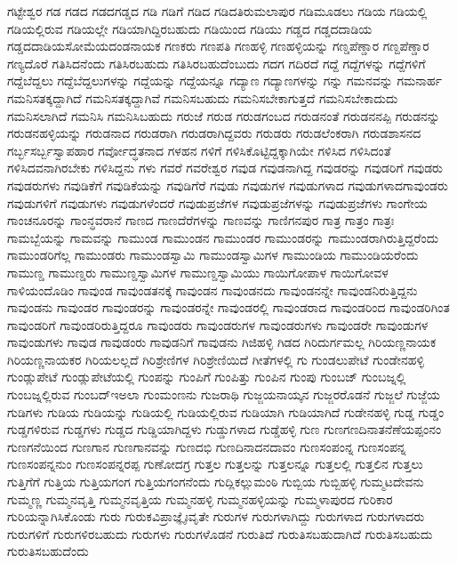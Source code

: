 {ಗಟ್ಟೇಶ್ವರ
ಗಡ
ಗಡದ
ಗಡದಗಡ್ಡದ
ಗಡಿ
ಗಡಿಗೆ
ಗಡಿದ
ಗಡಿದತಿರುಮಲಾಪುರ
ಗಡಿಮೂಡಲು
ಗಡಿಯ
ಗಡಿಯಲ್ಲಿ
ಗಡಿಯಲ್ಲಿರುವ
ಗಡಿಯಲ್ಲೇ
ಗಡಿಯಾಗಿದ್ದಿರಬಹುದು
ಗಡಿಯಿಂದ
ಗಡಿಯು
ಗಡ್ಡದ
ಗಡ್ಡದದಾಡಿಯ
ಗಡ್ಡದದಾಡಿಯಸೋಮೆಯದಂಡನಾಯಕ
ಗಣಕರು
ಗಣಪತಿ
ಗಣಹಳ್ಳಿ
ಗಣಹಳ್ಳಿಯನ್ನು
ಗಣ್ಡಪೆಣ್ಡಾರ
ಗಣ್ದಪೆಣ್ಡಾರ
ಗಣ್ಯದೊರೆ
ಗತಿಸಿದನೆಂದು
ಗತಿಸಿರಬಹುದು
ಗತಿಸಿರಬಹುದೆಂಬುದು
ಗದಗ
ಗದಿರದೆ
ಗದ್ದೆ
ಗದ್ದೆಗಳನ್ನು
ಗದ್ದೆಗಳಿಗೆ
ಗದ್ದೆಬೆದ್ದಲು
ಗದ್ದೆಬೆದ್ದಲುಗಳನ್ನು
ಗದ್ದೆಯನ್ನು
ಗದ್ದೆಯನ್ನೂ
ಗದ್ಯಾಣ
ಗದ್ಯಾಣಗಳನ್ನು
ಗನ್ನು
ಗಮನವನ್ನು
ಗಮನಾರ್ಹ
ಗಮನಿಸತಕ್ಕದ್ದಾಗಿದೆ
ಗಮನಿಸತಕ್ಕದ್ದಾಗಿವೆ
ಗಮನಿಸಬಹುದು
ಗಮನಿಸಬೇಕಾಗುತ್ತದೆ
ಗಮನಿಸಬೇಕಾದುದು
ಗಮನಿಸಲಾಗಿದೆ
ಗಮನಿಸಿ
ಗಮನಿಸಿಬಹುದು
ಗರುಜೆ
ಗರುಡ
ಗರುಡಗಂಬದ
ಗರುಡನಂತೆ
ಗರುಡನನಪ್ಪಿ
ಗರುಡನನ್ನು
ಗರುಡನಹಳ್ಳಿಯನ್ನು
ಗರುಡನಾದ
ಗರುಡರಾಗಿ
ಗರುಡರಾಗಿದ್ದವರು
ಗರುಡರು
ಗರುಡಲೆಂಕರಾಗಿ
ಗರುಡಶಾಸನದ
ಗರ್ಬ್ಭಸರ್ಬ್ಬಸ್ವಾಪಹಾರ
ಗರ್ವೋದ್ಧತನಾದ
ಗಳಹನ
ಗಳಿಗೆ
ಗಳಿಸಿಕೊಟ್ಟಿದ್ದಕ್ಕಾಗಿಯೇ
ಗಳಿಸಿದ
ಗಳಿಸಿದಂತೆ
ಗಳಿಸಿದವನಾಗಿರಬೇಕು
ಗಳಿಸಿದ್ದನು
ಗಳು
ಗವರೆ
ಗವರೇಶ್ವರ
ಗವುಡ
ಗವುಡನಾಗಿದ್ದ
ಗವುಡರನ್ನು
ಗವುಡರಿಗೆ
ಗವುಡರು
ಗವುಡರುಗಳು
ಗವುಡಿಕೆಗೆ
ಗವುಡಿಕೆಯನ್ನು
ಗವುಡಿಗೆರೆ
ಗವುಡು
ಗವುಡುಗಳ
ಗವುಡುಗಳಾದ
ಗವುಡುಗಳಾದಗಾವುಂಡರು
ಗವುಡುಗಳಿಗೆ
ಗವುಡುಗಳು
ಗವುಡುಗಳೆಂದರೆ
ಗವುಡುಪ್ರಜೆಗಳ
ಗವುಡುಪ್ರಜೆಗಳನ್ನು
ಗವುಡುಪ್ರಜೆಗಳು
ಗಾಂಗೇಯ
ಗಾಂಚನೂರನ್ನು
ಗಾಂನ್ಧವರಾನೆ
ಗಾಣದ
ಗಾಣದೆರೆಗಳನ್ನು
ಗಾಣವನ್ನು
ಗಾಣಿಗನಪುರ
ಗಾತ್ರ
ಗಾತ್ರಂ
ಗಾತ್ರಃ
ಗಾಮಬ್ಬೆಯನ್ನು
ಗಾಮವನ್ನು
ಗಾಮುಂಡ
ಗಾಮುಂಡನ
ಗಾಮುಂಡರ
ಗಾಮುಂಡರನ್ನು
ಗಾಮುಂಡರಾಗಿರುತ್ತಿದ್ದರೆಂದು
ಗಾಮುಂಡರಿಗೆಲ್ಲ
ಗಾಮುಂಡರು
ಗಾಮುಂಡಸ್ವಾಮಿ
ಗಾಮುಂಡಸ್ವಾಮಿಗಳ
ಗಾಮುಂಡಿಯ
ಗಾಮುಂಡಿಯರೆಂದು
ಗಾಮುಣ್ಡ
ಗಾಮುಣ್ಡರು
ಗಾಮುಣ್ಡಸ್ವಾಮಿಗಳ
ಗಾಮುಣ್ಡಸ್ವಾಮಿಯು
ಗಾಯಿಗೋಪಾಳ
ಗಾಯಿಗೋವಳ
ಗಾಳಿಯಂದೊಡಿಂ
ಗಾವುಂಡ
ಗಾವುಂಡತನಕ್ಕೆ
ಗಾವುಂಡನ
ಗಾವುಂಡನದು
ಗಾವುಂಡನನ್ನೇ
ಗಾವುಂಡನಿರುತ್ತಿದ್ದನು
ಗಾವುಂಡನು
ಗಾವುಂಡರ
ಗಾವುಂಡರನ್ನು
ಗಾವುಂಡರನ್ನೇ
ಗಾವುಂಡರಲ್ಲಿ
ಗಾವುಂಡರಾದ
ಗಾವುಂಡರಿಂದ
ಗಾವುಂಡರಿಗಿಂತ
ಗಾವುಂಡರಿಗೆ
ಗಾವುಂಡರಿರುತ್ತಿದ್ದರೂ
ಗಾವುಂಡರು
ಗಾವುಂಡರುಗಳ
ಗಾವುಂಡರುಗಳು
ಗಾವುಂಡರೇ
ಗಾವುಂಡುಗಳ
ಗಾವುಂಡುಗಳು
ಗಾವುಡ
ಗಾವುಡಂರು
ಗಾವುಡನಿಗೆ
ಗಾವುಡನು
ಗಿಜಿಹಳ್ಳಿ
ಗಿಡದ
ಗಿರಿದುರ್ಗಮಲ್ಲ
ಗಿರಿಯಣ್ಣನಾಯಕ
ಗಿರಿಯಣ್ಣನಾಯಕರ
ಗಿರಿಯಲಲ್ಲದೆ
ಗಿರಿಶ್ರೇಣಿಗಳ
ಗಿರಿಶ್ರೇಣಿಯಿದೆ
ಗೀತೆಗಳಲ್ಲಿ
ಗು
ಗುಂಡಲುಪೇಟೆ
ಗುಂಡೇನಹಳ್ಳಿ
ಗುಂಡ್ಲುಪೇಟೆ
ಗುಂಡ್ಲುಪೇಟೆಯಲ್ಲಿ
ಗುಂಪನ್ನು
ಗುಂಪಿಗೆ
ಗುಂಪಿತ್ತು
ಗುಂಪಿನ
ಗುಂಪು
ಗುಂಬಜ್
ಗುಂಬಜ್ನಲ್ಲಿ
ಗುಂಬಜ್ನಲ್ಲಿರುವ
ಗುಂಬದ್ಇಅಲಾ
ಗುಂಮಂಣನು
ಗುಜರಾಥಿ
ಗುಜ್ಜಯನಾಯ್ಕನ
ಗುಜ್ಜರರೊಡನೆ
ಗುಜ್ಜಲೆ
ಗುಜ್ಜೆಯ
ಗುಡಿಗಳು
ಗುಡಿಯ
ಗುಡಿಯನ್ನು
ಗುಡಿಯಲ್ಲಿ
ಗುಡಿಯಲ್ಲಿರುವ
ಗುಡಿಯಾಗಿ
ಗುಡಿಯಾಗಿದೆ
ಗುಡೇನಹಳ್ಳಿ
ಗುಡ್ಡ
ಗುಡ್ಡಂ
ಗುಡ್ಡಗಳಿರುವ
ಗುಡ್ಡಗಳು
ಗುಡ್ಡದ
ಗುಡ್ಡಿಯಾಗಿದ್ದಳು
ಗುಡ್ಡುಗಳಾದ
ಗುಡ್ಡೆಹಳ್ಳಿ
ಗುಣ
ಗುಣಗಣದಿನಾತನೆಣೆಯಪ್ಪಂನಂ
ಗುಣಗನೆಯಿಂದ
ಗುಣಗಾನ
ಗುಣಗಾನವನ್ನು
ಗುಣದಭಿ
ಗುಣದಿನಾದನದಾವಂ
ಗುಣಸಂಪಂನ್ನ
ಗುಣಸಂಪನ್ನ
ಗುಣಸಂಪನ್ನನುಂ
ಗುಣಸಂಪನ್ನರಪ್ಪ
ಗುಣೋದಗ್ರ
ಗುತ್ತಲ
ಗುತ್ತಲನ್ನು
ಗುತ್ತಲನ್ನೂ
ಗುತ್ತಲಲ್ಲಿ
ಗುತ್ತಲಿನ
ಗುತ್ತಲು
ಗುತ್ತಿಗೆಗೆ
ಗುತ್ತಿಯ
ಗುತ್ತಿಯಗಂಗ
ಗುತ್ತಿಯಗಂಗನೆಂದು
ಗುದ್ಲಿಕಲ್ಲುಮಂಠಿ
ಗುಬ್ಬಿಯ
ಗುಬ್ಬಿಹಳ್ಳಿ
ಗುಮ್ಮಟದೇವನು
ಗುಮ್ಮಣ್ಣ
ಗುಮ್ಮನವೃತ್ತಿ
ಗುಮ್ಮನವೃತ್ತಿಯ
ಗುಮ್ಮನಹಳ್ಳಿ
ಗುಮ್ಮನಹಳ್ಳಿಯನ್ನು
ಗುಮ್ಮಳಾಪುರದ
ಗುರಿಕಾರ
ಗುರಿಯನ್ನಾಗಿಸಿಕೊಂಡು
ಗುರು
ಗುರುಕವಿಪ್ರಾಜ್ಞೈಃವೃತೇ
ಗುರುಗಳ
ಗುರುಗಳಾಗಿದ್ದು
ಗುರುಗಳಾದ
ಗುರುಗಳಾದರು
ಗುರುಗಳಿಗೆ
ಗುರುಗಳಿರಬಹುದು
ಗುರುಗಳು
ಗುರುಗಳೊಡನೆ
ಗುರುತಿದೆ
ಗುರುತಿಸಬಹುದಾಗಿದೆ
ಗುರುತಿಸಬಹುದು
ಗುರುತಿಸಬಹುದೆಂದು
}
